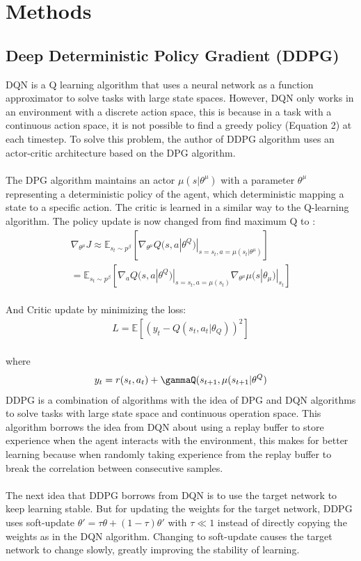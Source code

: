 \section{Methods}
\subsection{Deep Deterministic Policy Gradient (DDPG)}
DQN is a Q learning algorithm that uses a neural network as a function approximator to solve tasks with large state spaces. However, DQN only works in an environment with a discrete action space, this is because in a task with a continuous action space, it is not possible to find a greedy policy (Equation 2) at each timestep. To solve this problem, the author of DDPG algorithm uses an actor-critic architecture based on the DPG algorithm.\\
\\
The DPG algorithm maintains an actor $\mu(s|\theta^{\mu})$ with a parameter $\theta^\mu$ representing a deterministic policy of the agent, which deterministic mapping a state to a specific action. The critic is learned in a similar way to the Q-learning algorithm. The policy update is now changed from find maximum Q to \cite{DDPG}:
\begin{equation}
\begin{split}
\nabla_{\theta^\mu}J
\approx \mathbb{E}_{s_t \sim p^\beta}[\nabla_{\theta^\mu} Q(s,a|\theta^Q)|_{s=s_t,a=\mu(s_t|\theta^\mu)}]\\
=  \mathbb{E}_{s_t \sim p^\beta}[\nabla_a Q(s,a|\theta^Q)|_{s=s_t,a=\mu(s_t)}\nabla_{\theta^\mu}\mu(s|\theta_\mu)|_{s_t}]
\end{split}
\end{equation}\\
And Critic update by minimizing the loss:
\begin{align}
L = \mathbb{E}[(y_t - Q(s_t,a_t|\theta_Q))^2] 
\end{align} \\ where 
\begin{align}
y_t = r(s_t,a_t) + \gammaQ(s_{t+1},\mu(s_{t+1}|\theta^Q)
\end{align}
DDPG is a combination of algorithms with the idea of DPG and DQN algorithms to solve tasks with large state space and continuous operation space. This algorithm borrows the idea from DQN about using a replay buffer to store experience when the agent interacts with the environment, this makes for better learning because when randomly taking experience from the replay buffer to break the correlation between consecutive samples. \\ \\
The next idea that DDPG borrows from DQN is to use the target network to keep learning stable. But for updating the weights for the target network, DDPG uses soft-update $\theta' = \tau\theta + (1-\tau)\theta'$ with $\tau \ll 1$ instead of directly copying the weights as in the DQN algorithm. Changing to soft-update causes the target network to change slowly, greatly improving the stability of learning. 

